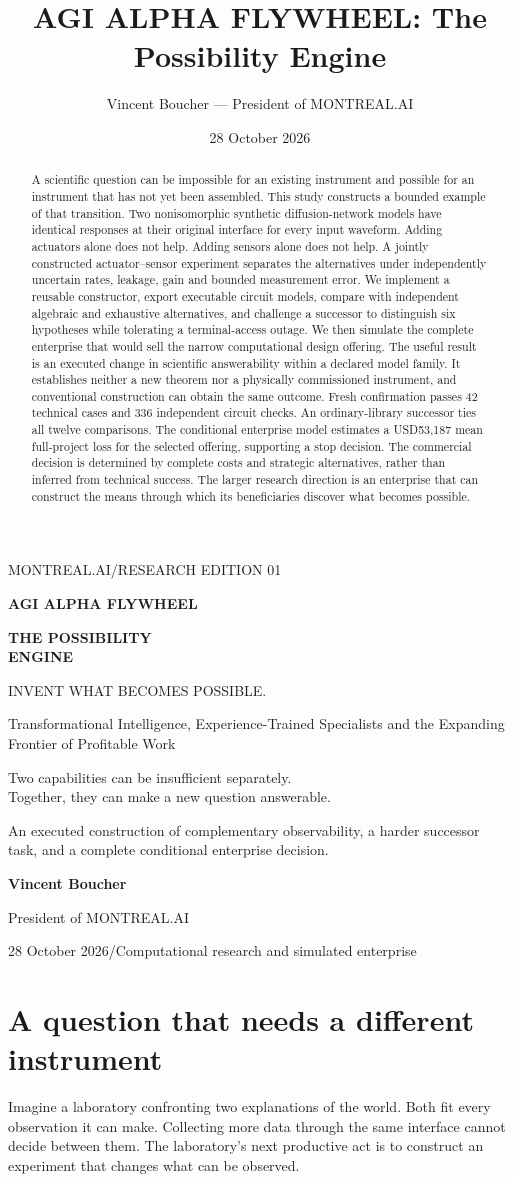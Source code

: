 \documentclass[
  11pt,
]{article}
\title{AGI ALPHA FLYWHEEL: The Possibility Engine}
\author{Vincent Boucher --- President of MONTREAL.AI}
\date{28 October 2026}
\renewcommand{\maketitle}{%
\begin{titlepage}\raggedright\color{ink}
{\sffamily\small\color{teal}MONTREAL.AI\quad /\quad RESEARCH EDITION 01}\par
\vspace{1.0in}
{\sffamily\bfseries\fontsize{17}{21}\selectfont AGI ALPHA FLYWHEEL}\par
\vspace{.3in}
{\sffamily\bfseries\fontsize{39}{44}\selectfont THE POSSIBILITY\\ENGINE}\par
\vspace{.3in}
{\sffamily\large\color{teal}INVENT WHAT BECOMES POSSIBLE.}\par
\vspace{.55in}
{\large Transformational Intelligence, Experience-Trained Specialists and the Expanding Frontier of Profitable Work}\par
\vspace{.45in}
\colorbox{pale}{\begin{minipage}{.92\linewidth}\vspace{.14in}
\large Two capabilities can be insufficient separately.\\Together, they can make a new question answerable.\par
\vspace{.08in}\normalsize An executed construction of complementary observability, a harder successor task, and a complete conditional enterprise decision.
\vspace{.14in}\end{minipage}}\par
\vfill
{\sffamily\bfseries\large Vincent Boucher}\par
{\sffamily President of MONTREAL.AI}\par
\vspace{.15in}
{\sffamily\small\color{muted}28 October 2026\quad /\quad Computational research and simulated enterprise}\par
\end{titlepage}}
\begin{document}
\maketitle
\begin{abstract}
A scientific question can be impossible for an existing instrument and
possible for an instrument that has not yet been assembled. This study
constructs a bounded example of that transition. Two nonisomorphic
synthetic diffusion-network models have identical responses at their
original interface for every input waveform. Adding actuators alone does
not help. Adding sensors alone does not help. A jointly constructed
actuator--sensor experiment separates the alternatives under
independently uncertain rates, leakage, gain and bounded measurement
error. We implement a reusable constructor, export executable circuit
models, compare with independent algebraic and exhaustive alternatives,
and challenge a successor to distinguish six hypotheses while tolerating
a terminal-access outage. We then simulate the complete enterprise that
would sell the narrow computational design offering. The useful result
is an executed change in scientific answerability within a declared
model family. It establishes neither a new theorem nor a physically
commissioned instrument, and conventional construction can obtain the
same outcome. Fresh confirmation passes 42 technical cases and 336
independent circuit checks. An ordinary-library successor ties all
twelve comparisons. The conditional enterprise model estimates a
USD53,187 mean full-project loss for the selected offering, supporting a
stop decision. The commercial decision is determined by complete costs
and strategic alternatives, rather than inferred from technical success.
The larger research direction is an enterprise that can construct the
means through which its beneficiaries discover what becomes possible.
\end{abstract}

{
\hypersetup{linkcolor=}
\setcounter{tocdepth}{1}
\tableofcontents
}
\hypertarget{a-question-that-needs-a-different-instrument}{%
\section{A question that needs a different
instrument}\label{a-question-that-needs-a-different-instrument}}

Imagine a laboratory confronting two explanations of the world. Both fit
every observation it can make. Collecting more data through the same
interface cannot decide between them. The laboratory's next productive
act is to construct an experiment that changes what can be observed.
\end{document}
